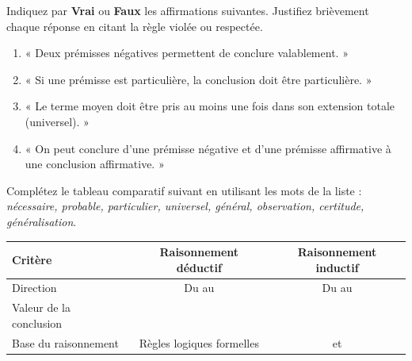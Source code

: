 \documentclass[11pt]{article}
\begin{document}
\begin{exercice}
Indiquez par \textbf{Vrai} ou \textbf{Faux} les affirmations suivantes. Justifiez brièvement chaque réponse en citant la règle violée ou respectée.
\begin{enumerate}
    \item « Deux prémisses négatives permettent de conclure valablement. »
    \item « Si une prémisse est particulière, la conclusion doit être particulière. »
    \item « Le terme moyen doit être pris au moins une fois dans son extension totale (universel). »
    \item « On peut conclure d'une prémisse négative et d'une prémisse affirmative à une conclusion affirmative. »
\end{enumerate}
\end{exercice}

\begin{exercice}
Complétez le tableau comparatif suivant en utilisant les mots de la liste : \textit{nécessaire, probable, particulier, universel, général, observation, certitude, généralisation}.
\begin{center}
\begin{tabular}{|l|c|c|}
\hline
\textbf{Critère} & \textbf{Raisonnement déductif} & \textbf{Raisonnement inductif} \\ \hline
Direction & Du \underline{\hspace{2.5cm}} au \underline{\hspace{2.5cm}} & Du \underline{\hspace{2.5cm}} au \underline{\hspace{2.5cm}} \\ \hline
Valeur de la conclusion & \underline{\hspace{2.5cm}} & \underline{\hspace{2.5cm}} \\ \hline
Base du raisonnement & Règles logiques formelles & \underline{\hspace{2.5cm}} et \underline{\hspace{2.5cm}} \\ \hline
\end{tabular}
\end{center}
\end{exercice}
\end{document}
